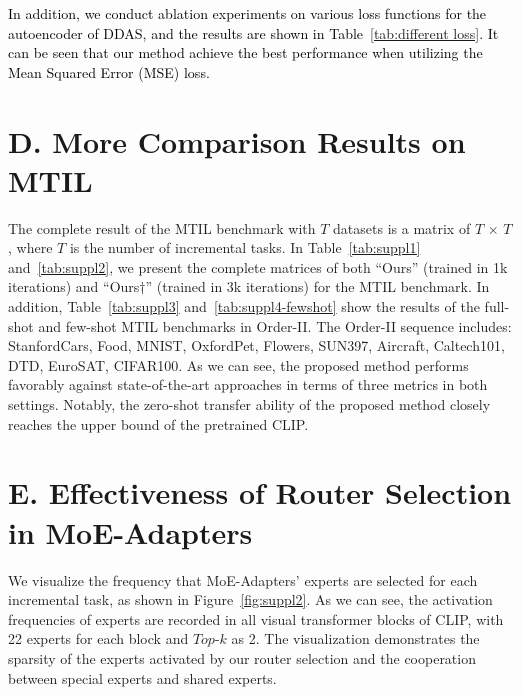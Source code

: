 \textcolor{black}{In addition, we conduct ablation experiments on various loss functions for the autoencoder of DDAS, and the results are shown in Table~\ref{tab:different loss}. It can be seen that our method achieve the best performance when utilizing the Mean Squared Error (MSE) loss.}
% 

\section*{D. More Comparison Results on MTIL}
\label{sec:More comparison results on MTIL}
The complete result of the MTIL benchmark with $T$ datasets is a matrix of $T$ × $T$, where $T$ is the number of incremental tasks. 
In Table~\ref{tab:suppl1} and~\ref{tab:suppl2}, we present the complete matrices of both ``Ours'' (trained in 1k iterations) and ``Ours$\dagger$'' (trained in 3k iterations) for the MTIL benchmark. 
In addition, Table~\ref{tab:suppl3} and~\ref{tab:suppl4-fewshot} show the results of the full-shot and few-shot MTIL benchmarks in Order-II. The Order-II sequence includes: StanfordCars, Food, MNIST, OxfordPet, Flowers, SUN397, Aircraft, Caltech101, DTD, EuroSAT, CIFAR100. As we can see, the proposed method performs favorably against state-of-the-art approaches in terms of three metrics in both settings. Notably, the zero-shot transfer ability of the proposed method closely reaches the upper bound of the pretrained CLIP.




\section*{E. Effectiveness of Router Selection in MoE-Adapters}
\label{sec: More visualization on MoE-Adapters}
We visualize the frequency that MoE-Adapters' experts are selected for each incremental task, as shown in Figure~\ref{fig:suppl2}. 
As we can see, the activation frequencies of experts are recorded in all visual transformer blocks of CLIP, with 22 experts for each block and $Top$-$k$ as 2. 
The visualization demonstrates the sparsity of the experts activated by our router selection and the cooperation between special experts and shared experts.

